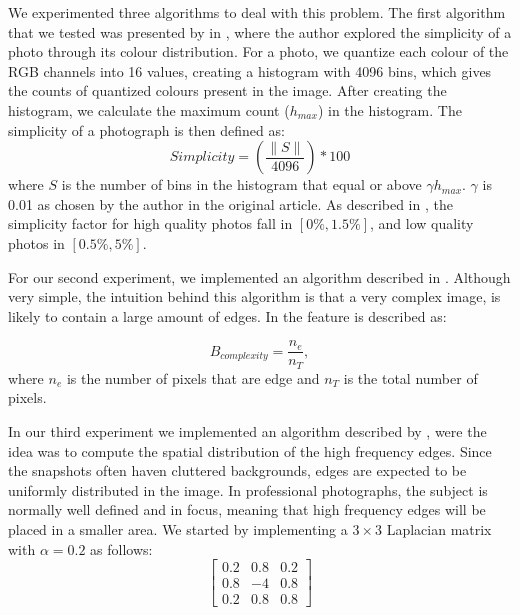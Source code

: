 We experimented three algorithms to deal with this problem. The first algorithm that we tested was presented by \citeauthor{luo2008photo} in \cite{luo2008photo}, where the author explored the simplicity of a photo through its colour distribution. For a photo, we quantize each colour of the RGB channels into 16 values, creating a histogram with 4096 bins, which gives the counts of quantized colours present in the image. After creating the histogram, we calculate the maximum count ($h_{max}$) in the histogram. The simplicity of a photograph is then defined as:
\begin{equation}
	Simplicity = \left(\frac{\|S\|}{4096}\right) * 100%
\end{equation}
where $S$ is the number of bins in the histogram that equal or above $\gamma h_{max}$. $\gamma$ is 0.01 as chosen by the author in the original article. As described in \cite{luo2008photo}, the simplicity factor for high quality photos fall in $[0\%,1.5\%]$, and low quality photos in $[0.5\%,5\%]$.


For our second experiment, we implemented an algorithm described in \cite{kaoautomatic}. Although very simple, the intuition behind this algorithm is that a very complex image, is likely to contain a large amount of edges. In \cite{kaoautomatic} the feature is described as:

\begin{equation}
	B_{complexity} = \frac{n_{e}}{n_{T}},
\end{equation}
where $n_{e}$ is the number of pixels that are edge and $n_{T}$ is the total number of pixels.
 

In our third experiment we implemented an algorithm described by \citeauthor{ke2006design} \cite{ke2006design}, were the idea was to compute the spatial distribution of the high frequency edges. Since the snapshots often haven cluttered backgrounds, edges are expected to be uniformly distributed in the image. In professional photographs, the subject is normally well defined and in focus, meaning that high frequency edges will be placed in a smaller area.
We started by implementing a $3\times3$ Laplacian matrix with $\alpha = 0.2$ as follows:
\begin{equation}
\begin{bmatrix}
  0.2 & 0.8 & 0.2 \\
  0.8 & -4 & 0.8 \\
  0.2 & 0.8 & 0.8
\end{bmatrix}
\end{equation}

